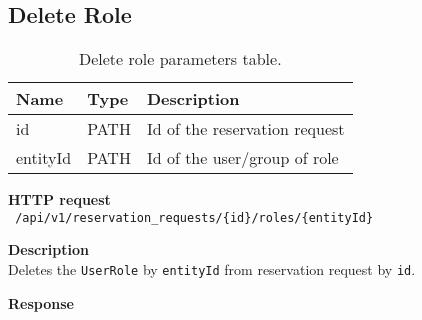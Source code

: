 \subsection{Delete Role}
\begin{table}[ht!]
    \begin{tabularx}{\textwidth}{llX}
        \toprule
        Name & Type & Description \\
        \midrule
        id & PATH & Id of the reservation request \\
        entityId & PATH & Id of the user/group of role \\
        \end{tabularx}
    \caption{Delete role parameters table.}
\end{table}
\begin{description}
    \item \textbf{HTTP request}\\
        \texttt{\text{[DELETE]} /api/v1/reservation\_requests/\{id\}/roles/\{entityId\}}
    \item \textbf{Description}\\
        Deletes the \texttt{UserRole} by \texttt{entityId} from reservation request by \texttt{id}.
    \item \textbf{Response}\\
        \texttt{\text{[200 OK]}}
\end{description}

